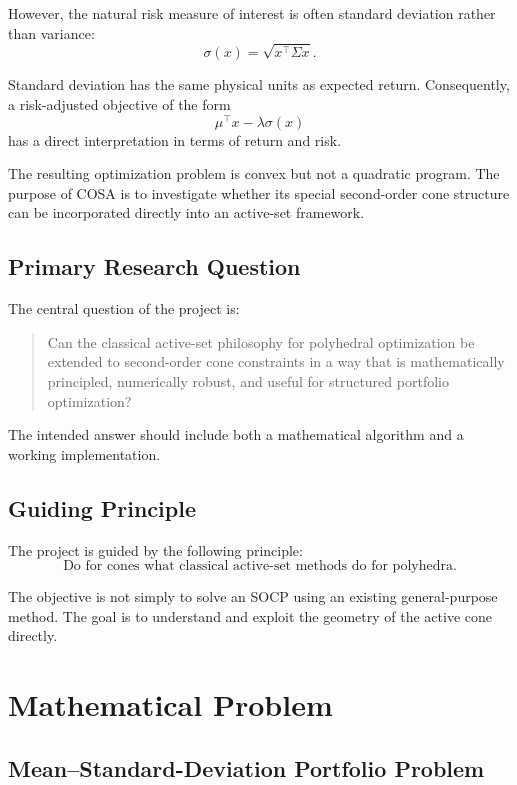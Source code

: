 \documentclass[11pt,a4paper]{article}
\begin{document}
However, the natural risk measure of interest is often standard
deviation rather than variance:
\[
\sigma(x)
=
\sqrt{x^{\top}\Sigma x}.
\]

Standard deviation has the same physical units as expected return.
Consequently, a risk-adjusted objective of the form
\[
\mu^{\top}x-\lambda\sigma(x)
\]
has a direct interpretation in terms of return and risk.

The resulting optimization problem is convex but not a quadratic
program. The purpose of COSA is to investigate whether its special
second-order cone structure can be incorporated directly into an
active-set framework.

\subsection{Primary Research Question}

The central question of the project is:

\begin{quote}
Can the classical active-set philosophy for polyhedral optimization
be extended to second-order cone constraints in a way that is
mathematically principled, numerically robust, and useful for
structured portfolio optimization?
\end{quote}

The intended answer should include both a mathematical algorithm and
a working implementation.

\subsection{Guiding Principle}

The project is guided by the following principle:
\[
\boxed{
\text{Do for cones what classical active-set methods do for
polyhedra.}
}
\]

The objective is not simply to solve an SOCP using an existing
general-purpose method. The goal is to understand and exploit the
geometry of the active cone directly.

\section{Mathematical Problem}

\subsection{Mean--Standard-Deviation Portfolio Problem}
\end{document}

